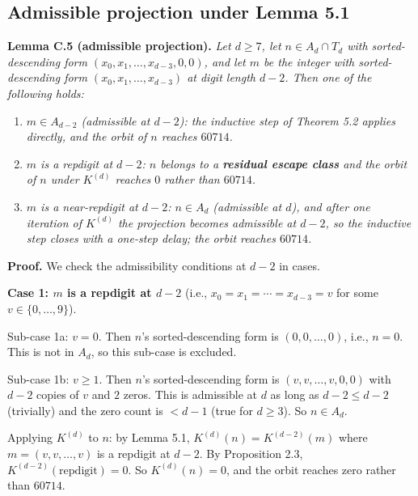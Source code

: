 \documentclass[11pt,letterpaper]{article}
\providecommand{\tightlist}{%
  \setlength{\itemsep}{0pt}\setlength{\parskip}{0pt}}
\theoremstyle{paperstyle}
\theoremstyle{paperstyledef}
\theoremstyle{paperstylerem}
\begin{document}
\hypertarget{c.6-admissible-projection-under-lemma-5.1}{%
\subsection{Admissible projection under Lemma 5.1}\label{c.6-admissible-projection-under-lemma-5.1}}

\textbf{Lemma C.5 (admissible projection).} \emph{Let \(d \geq 7\), let
\(n \in A_d \cap T_d\) with sorted-descending form
\((x_0, x_1, \ldots, x_{d-3}, 0, 0)\), and let \(m\) be the integer with
sorted-descending form \((x_0, x_1, \ldots, x_{d-3})\) at digit length
\(d - 2\). Then one of the following holds:}

\begin{enumerate}
\def\labelenumi{\arabic{enumi}.}
\tightlist
\item
  \emph{\(m \in A_{d-2}\) (admissible at \(d - 2\)): the inductive step
  of Theorem 5.2 applies directly, and the orbit of \(n\) reaches
  \(60714\).}
\item
  \emph{\(m\) is a repdigit at \(d - 2\): \(n\) belongs to a
  \textbf{residual escape class} and the orbit of \(n\) under
  \(K^{(d)}\) reaches \(0\) rather than \(60714\).}
\item
  \emph{\(m\) is a near-repdigit at \(d - 2\): \(n \in A_d\) (admissible
  at \(d\)), and after one iteration of \(K^{(d)}\) the projection
  becomes admissible at \(d - 2\), so the inductive step closes with a
  one-step delay; the orbit reaches \(60714\).}
\end{enumerate}

\textbf{Proof.} We check the admissibility conditions at \(d - 2\) in
cases.

\textbf{Case 1: \(m\) is a repdigit at \(d - 2\)} (i.e.,
\(x_0 = x_1 = \cdots = x_{d-3} = v\) for some
\(v \in \{0, \ldots, 9\}\)).

Sub-case 1a: \(v = 0\). Then \(n\)'s sorted-descending form is
\((0, 0, \ldots, 0)\), i.e., \(n = 0\). This is not in \(A_d\), so this
sub-case is excluded.

Sub-case 1b: \(v \geq 1\). Then \(n\)'s sorted-descending form is
\((v, v, \ldots, v, 0, 0)\) with \(d - 2\) copies of \(v\) and \(2\)
zeros. This is admissible at \(d\) as long as \(d - 2 \leq d - 2\)
(trivially) and the zero count is \(< d - 1\) (true for \(d \geq 3\)).
So \(n \in A_d\).

Applying \(K^{(d)}\) to \(n\): by Lemma 5.1,
\(K^{(d)}(n) = K^{(d-2)}(m)\) where \(m = (v, v, \ldots, v)\) is a
repdigit at \(d - 2\). By Proposition 2.3,
\(K^{(d-2)}(\text{repdigit}) = 0\). So \(K^{(d)}(n) = 0\), and the orbit
reaches zero rather than \(60714\).
\end{document}
